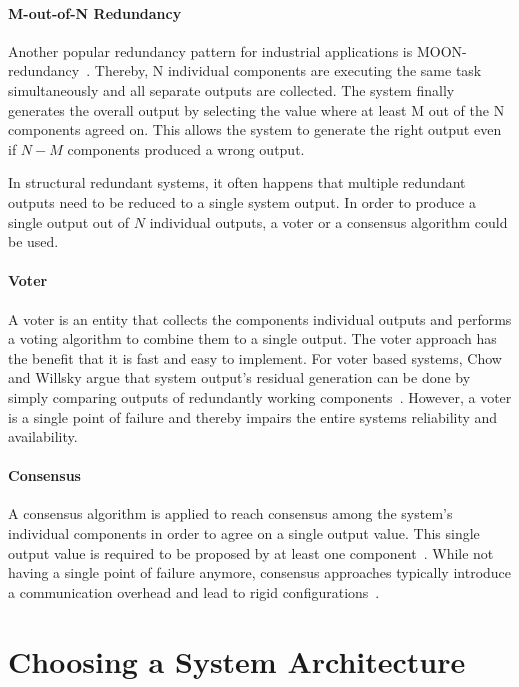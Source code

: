 \paragraph{M-out-of-N Redundancy}
Another popular redundancy pattern for industrial applications is \gls*{MOON}-redundancy~\cite{GamerIncreasingMOON}.
Thereby, N individual components are executing the same task simultaneously and all separate outputs are collected.
The system finally generates the overall output by selecting the value where at least M out of the N components agreed on.
This allows the system to generate the right output even if $N-M$ components produced a wrong output.




In structural redundant systems, it often happens that multiple redundant outputs need to be reduced to a single system output.
In order to produce a single output out of $N$ individual outputs, a voter or a consensus algorithm could be used.

\paragraph{Voter} 
A voter is an entity that collects the components individual outputs and performs a voting algorithm to combine them to a single output.
The voter approach has the benefit that it is fast and easy to implement.
For voter based systems, Chow and Willsky argue that system output's residual generation can be done by simply comparing outputs of redundantly working components~\cite{ChowFailureDetectionSystems}.
However, a voter is a single point of failure and thereby impairs the entire systems reliability and availability.

\paragraph{Consensus} 
A consensus algorithm is applied to reach consensus among the system's individual components in order to agree on a single output value.
This single output value is required to be proposed by at least one component~\cite{lamport2001paxos}.
While not having a single point of failure anymore, consensus approaches typically introduce a communication overhead and lead to rigid configurations~\cite{GamerIncreasingMOON}.


\section{Choosing a System Architecture}







